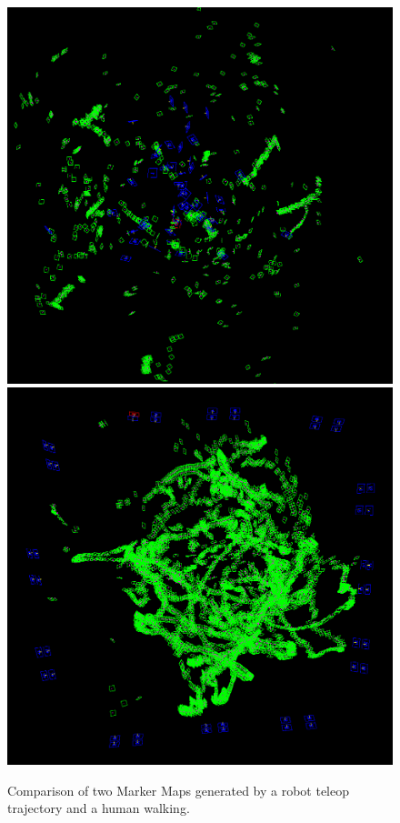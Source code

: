 \documentclass{article}
\begin{document}
    \begin{figure}[H]
      \centering
      \includegraphics[width=0.49\linewidth]{./images/marker_mapper_example_bad.png}
      \includegraphics[width=0.49\linewidth]{./images/marker_mapper_good_ps3_3_17.png}
      \caption{Comparison of two Marker Maps generated by a robot teleop trajectory and a human walking.}
      \label{fig:marker_mapper_comparison}
    \end{figure}
\end{document}
